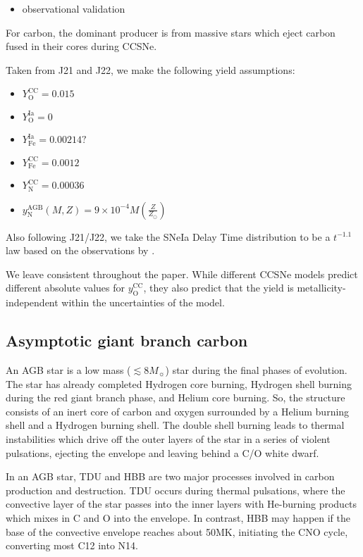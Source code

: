 \documentclass[fleqn,usenatbib]{mnras}
\begin{document}
\begin{itemize}
    \item observational validation
\end{itemize}
For carbon, the dominant producer is from massive stars which eject carbon fused in their cores during CCSNe. 

Taken from J21 and J22, we make the following yield assumptions:
\begin{itemize}
    \item $Y_\text{O}^\text{CC} = 0.015$
    \item $Y_\text{O}^\text{Ia} = 0$
    \item $Y_\text{Fe}^\text{Ia} = 0.00214?$
    \item $Y_\text{Fe}^\text{CC} = 0.0012$
    \item $Y_\text{N}^\text{CC} = 0.00036$
    \item $y_\text{N}^\text{AGB}(M, Z) = 9\times 10^{-4} M \left(\frac{Z}{Z_\odot}\right)$
\end{itemize}
Also following J21/J22, we take the SNeIa Delay Time distribution to be a $t^{-1.1}$ law based on the observations by \citet{2012MNRAS.426.3282M}.

We leave consistent throughout the paper. While different CCSNe models predict different absolute values for $y_\text{O}^\text{CC}$, they also predict that the yield is metallicity-independent within the uncertainties of the model. 





\subsection{Asymptotic giant branch carbon}

An AGB star is a low mass ($\lesssim 8 M_{\sun}$) star during the final phases of evolution. The star has already completed Hydrogen core burning, Hydrogen shell burning during the red giant branch phase, and Helium core burning. So, the structure consists of an inert core of carbon and oxygen surrounded by a Helium burning shell and a Hydrogen burning shell. The double shell burning leads to thermal instabilities which drive off the outer layers of the star in a series of violent pulsations, ejecting the envelope and leaving behind a C/O white dwarf. 

In an AGB star, TDU and HBB are two major processes involved in carbon production and destruction. TDU occurs during thermal pulsations, where the convective layer of the star passes into the inner layers with He-burning products which mixes in C and O into the envelope. In contrast, HBB may happen if the base of the convective envelope reaches about 50MK, initiating the CNO cycle, converting most C12 into N14. 
\end{document}
